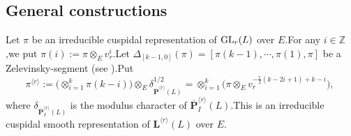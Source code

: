 \documentclass[SecEq,CM,GP]{degruyter-crelle} %
\theoremstyle{plain}
\newcommand{\GLN}{{\rm GL}}
\newcommand{\lrr}{{\langle r\rangle}}
\newcommand{\op}{{\overline{{\mathbf{P}}}}}
\newcommand{\BI}{{\mathbb{I}}}
\newcommand{\BZ}{{\mathbb{Z}}}
\newcommand{\bL}{{\mathbf{L}}}
\newcommand{\bZ}{{\mathbf{Z}}}
\begin{document}
\subsection{General constructions}
Let $\pi$ be an irreducible cuspidal representation of $\GLN_{r}(L)$ over $E$.\;For any $i\in \BZ$,\;we put $\pi(i):=\pi\otimes_E v_r^{i}$.\;Let $\Delta_{[k-1,0]}(\pi)=[\pi(k-1),\cdots,\pi(1),\pi]$ be a Zelevinsky-segment (see \cite{av1980induced2}).\;Put
\begin{equation}\label{pilrr}
\pi^{\lrr}:=\big(\otimes_{i=1}^{k}\pi(k-i)\big)\otimes_E \delta_{\op^{\lrr}(L)}^{1/2}=\otimes_{i=1}^{k}\big(\pi\otimes_E v_{r}^{-\frac{r}{2}(k-2i+1)+k-i}\big),\;
\end{equation}
where $\delta_{\op^{\lrr}_{{I}}(L)}$ is the modulus character of $\op^{\lrr}_{{I}}(L)$.\;This is an irreducible cuspidal smooth representation of $\bL^{\lrr}(L)$ over $E$.\;


\end{document}
